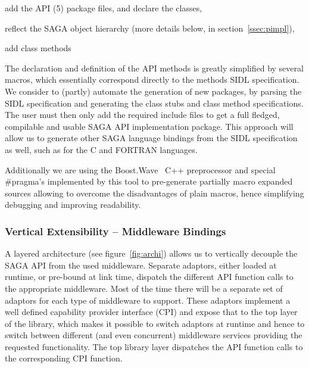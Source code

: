   \begin{shortlist}
	   \item add the API (5) package files, and declare the classes,
	   \item reflect the SAGA object hierarchy (more details below, in
	   			 section~\ref{ssec:pimpl}), 
	   \item add class methods
  \end{shortlist}

  The declaration and definition of the API methods is greatly simplified by
  several macros, which essentially correspond directly to the methods
  SIDL specification.  We consider to (partly) automate the generation
  of new packages, by parsing the SIDL specification and generating the
  class stubs and class method specifications.  The user must then
  only add the required include files to get a full fledged,
  compilable and usable SAGA API implementation package. This approach will 
  allow us to generate other SAGA language bindings from the SIDL 
  specification as well, such as for the C and FORTRAN languages.
  
  Additionally we are using the Boost.Wave~\cite{wave_website} C++ preprocessor 
  and special \#pragma's implemented by this tool to pre-generate 
  partially macro expanded sources allowing to overcome the disadvantages 
	of plain macros, hence simplifying debugging and improving readability.
  
	
\subsubsection{Vertical Extensibility -- Middleware Bindings}

	A layered architecture (see figure~\ref{fig:archi}) allows us to vertically decouple the SAGA 
	API from the used middleware. Separate adaptors, either loaded at 
	runtime, or pre-bound at link time, dispatch the different API
	function calls to the appropriate middleware. Most of the time
	there will be a separate set of adaptors for each type of middleware to 
	support. These adaptors implement a well defined capability provider
	interface (CPI) and expose that to the top layer of the library, which makes it
	possible to switch adaptors at runtime and hence to switch between 
	different (and even concurrent) middleware services providing the requested 
	functionality. The top library layer dispatches the API function calls 
	to the corresponding CPI function.
	
